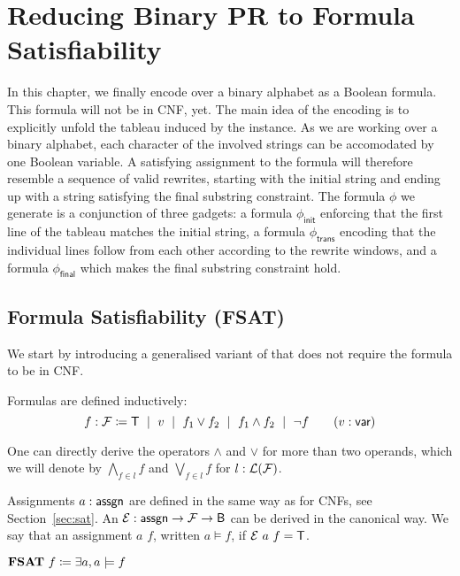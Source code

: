 
\chapter{Reducing Binary PR to Formula Satisfiability}\label{chap:bpr_fsat}
In this chapter, we finally encode \PR{} over a binary alphabet as a Boolean formula. This formula will not be in CNF, yet.
The main idea of the encoding is to explicitly unfold the tableau induced by the \BPR{} instance.
As we are working over a binary alphabet, each character of the involved strings can be accomodated by one Boolean variable. A satisfying assignment to the formula will therefore resemble a sequence of valid rewrites, starting with the initial string and ending up with a string satisfying the final substring constraint.
The formula $\phi$ we generate is a conjunction of three gadgets: a formula $\phi_{\textsf{init}}$ enforcing that the first line of the tableau matches the initial string, a formula $\phi_{\textsf{trans}}$ encoding that the individual lines follow from each other according to the rewrite windows, and a formula $\phi_{\textsf{final}}$ which makes the final substring constraint hold. 

\newcommand{\formula}{\mathcal{F}}
\section{Formula Satisfiability (FSAT)}
We start by introducing a generalised variant of \SAT{} that does not require the formula to be in CNF.

Formulas are defined inductively: 
\mnote[formula]{$\formula$}
\[f : \formula \defeq \btrue \bnfmid v \bnfmid f_1 \lor f_2 \bnfmid f_1 \land f_2 \bnfmid \lnot f \qquad (v : \bvar) \]

One can directly derive the operators $\land$ and $\lor$ for more than two operands, which we will denote by $\bigwedge_{f \in l} f$ and $\bigvee_{f \in l} f$ for $ l : \listsof{\formula}$. 

Assignments $a : \textsf{assgn}$ are defined in the same way as for CNFs, see Section~\ref{sec:sat}.
An  $\eval : \assgn \rightarrow \formula \rightarrow \bool$ can be derived in the canonical way. We say that an assignment $a$  $f$, written $a \models f$, if $\mathcal{E}~a~f = \mathsf{T}$.

\begin{definition}
  \mnote[FSAT]{\fsat{}}
  $\textbf{FSAT}{}~f \coloneqq \exists a, a \models f$
\end{definition}

